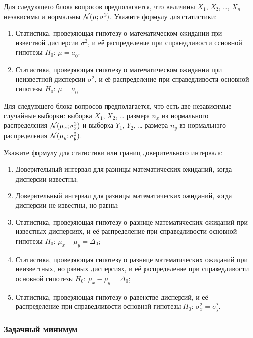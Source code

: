 Для следующего блока вопросов предполагается, что величины $X_1$, $X_2$, \ldots, $X_n$ независимы и нормальны $\mathcal{N}(\mu;\sigma^2)$.
Укажите формулу для статистики:

\begin{enumerate}[resume]
  \item Статистика, проверяющая гипотезу о математическом ожидании при известной дисперсии $\sigma^2$,
    и её распределение при справедливости основной гипотезы  $H_0$: $\mu = \mu_0$.
  \item Статистика, проверяющая гипотезу о математическом ожидании при неизвестной дисперсии $\sigma^2$,
    и её распределение при справедливости основной гипотезы  $H_0$: $\mu = \mu_0$.
\end{enumerate}


Для следующего блока вопросов предполагается, что есть две независимые случайные выборки:
выборка $X_1$, $X_2$, \ldots{ }размера $n_x$ из нормального распределения $\mathcal{N}(\mu_x;\sigma^2_x)$
и выборка $Y_1$, $Y_2$, \ldots{ }размера $n_y$ из нормального распределения $\mathcal{N}(\mu_y;\sigma^2_y)$.

Укажите формулу для статистики или границ доверительного интервала:

\begin{enumerate}[resume]
  \item Доверительный интервал для разницы математических ожиданий, когда дисперсии известны;
  \item Доверительный интервал для разницы математических ожиданий, когда дисперсии не известны, но равны;
  \item Статистика, проверяющая гипотезу о разнице математических ожиданий при известных дисперсиях,
    и её распределение при справедливости основной гипотезы $H_0$: $\mu_x - \mu_y = \Delta_0$;
  \item Статистика, проверяющая гипотезу о разнице математических ожиданий при неизвестных, но равных дисперсиях,
    и её распределение при справедливости основной гипотезы $H_0$: $\mu_x - \mu_y = \Delta_0$;
  \item Статистика, проверяющая гипотезу о равенстве дисперсий,
    и её распределение при справедливости основной гипотезы $H_0$: $\sigma^2_x = \sigma^2_y$.
\end{enumerate}


\newpage
\subsubsection*{\hyperref[sec:sol_minimum_kr_04]{Задачный минимум}}
\label{sec:minimum_kr_04}

